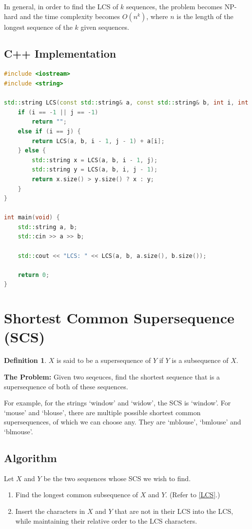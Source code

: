 \documentclass[12pt, a4paper]{article}
\theoremstyle{definition}
\newtheorem{definition}{Definition}[section]
\theoremstyle{remark}
\begin{document}
In general, in order to find the LCS of $k$ sequences, the problem becomes NP-hard and the time complexity becomes $O(n^k)$, where $n$ is the length of the longest sequence of the $k$ given sequences.

\subsection{C++ Implementation}
\begin{lstlisting}[language=C++]
#include <iostream>
#include <string>

std::string LCS(const std::string& a, const std::string& b, int i, int j) {
    if (i == -1 || j == -1)
        return "";
    else if (i == j) {
        return LCS(a, b, i - 1, j - 1) + a[i];
    } else {
        std::string x = LCS(a, b, i - 1, j);
        std::string y = LCS(a, b, i, j - 1);
        return x.size() > y.size() ? x : y;
    }
}

int main(void) {
    std::string a, b;
    std::cin >> a >> b;

    std::cout << "LCS: " << LCS(a, b, a.size(), b.size());

    return 0;
}
\end{lstlisting}

\section{Shortest Common Supersequence (SCS)}
\begin{definition}
    $X$ is said to be a supersequence of $Y$ if $Y$ is a subsequence of $X$.
\end{definition}

\begin{tcolorbox}
    \textbf{The Problem:} Given two seqeuces, find the shortest sequence that is a supersequence of both of these sequences.
\end{tcolorbox}

For example, for the strings `window' and `widow', the SCS is `window'. For `mouse' and `blouse', there are multiple possible shortest common supersequences, of which we can choose any. They are `mblouse', `bmlouse' and `blmouse'.

\subsection{Algorithm}
Let $X$ and $Y$ be the two sequences whose SCS we wish to find.
\begin{enumerate}
    \item Find the longest common subsequence of $X$ and $Y$. (Refer to \cref{LCS}.)
    \item Insert the characters in $X$ and $Y$ that are not in their LCS into the LCS, while maintaining their relative order to the LCS characters.
\end{enumerate}
\end{document}
